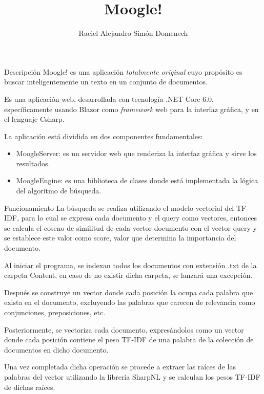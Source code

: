 \documentclass{beamer}
\title{Moogle!}
\author{Raciel Alejandro Simón Domenech}
\institute{MATCOM}
\date{}
\begin{document}
\begin{frame}
\titlepage
\end{frame}

\begin{frame}{Descripción}
Moogle! es una aplicación \textit{totalmente original} cuyo propósito es buscar inteligentemente un texto en un conjunto de documentos.

\bigskip

Es una aplicación web, desarrollada con tecnología .NET Core 6.0, específicamente usando Blazor como \textit{framework} web para la interfaz gráfica, y en el lenguaje Csharp.

\bigskip

La aplicación está dividida en dos componentes fundamentales:
\begin{itemize}
\item MoogleServer: es un servidor web que renderiza la interfaz gráfica y sirve los resultados.
\item MoogleEngine: es una biblioteca de clases donde está implementada la lógica del algoritmo de búsqueda.
\end{itemize}
\end{frame}

\begin{frame}{Funcionamiento}
La búsqueda se realiza utilizando el modelo vectorial del TF-IDF, para lo cual se expresa cada documento y el query como vectores, entonces se calcula el coseno de similitud de cada vector documento con el vector query y se establece este valor como score, valor que determina la importancia del documento.

\bigskip

Al iniciar el programa, se indexan todos los documentos con extensión .txt de la carpeta Content, en caso de no existir dicha carpeta, se lanzará una excepción.

\bigskip

Después se construye un vector donde cada posición la ocupa cada palabra que exista en el documento, excluyendo las palabras que carecen de relevancia como conjunciones, preposiciones, etc.

\bigskip

Posteriormente, se vectoriza cada documento, expresándolos como un vector donde cada posición contiene el peso TF-IDF de una palabra de la colección de documentos en dicho documento.

\bigskip

Una vez completada dicha operación se procede a extraer las raíces de las palabras del vector utilizando la librería SharpNL y se calculan los pesos TF-IDF de dichas raíces.
\end{frame}
\end{document}
